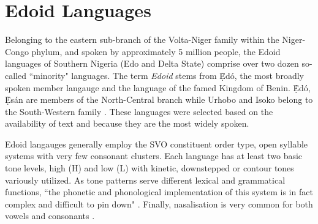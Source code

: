 \documentclass{article} %
\begin{document}

\section{Edoid Languages}


Belonging to the eastern sub-branch of the Volta-Niger family within the Niger-Congo phylum, and spoken by approximately 5 million people, the Edoid languages of Southern Nigeria (Edo and Delta State) comprise over two dozen so-called ``minority" languages. The term \emph{Edoid} stems from \d{\`E}d{\'o}, the most broadly spoken member langauge and the language of the famed Kingdom of Benin. \d{\`E}d{\'o}, \d{\`E}s{\'a}n are members of the North-Central branch while Urhobo and Isoko belong to the South-Western family \citep{wiki_Edoid}. These languages were selected based on the availability of text and because they are the most widely spoken.

Edoid langauges generally employ the SVO constituent order type, open syllable systems with very few consonant clusters. Each language has at least two basic tone levels, high (H) and low (L) with kinetic, downstepped or contour tones variously utilized. As tone patterns serve different lexical and grammatical functions, ``the phonetic and phonological implementation of this system is in fact complex and difficult to pin down" \citep{rolle2013phonetics, ogie2009multi, adeniyi2010tone, ilolo2013vowel}. Finally, nasalisation is very common for both vowels and consonants \citep{Elugbe_1989, isoko_phonetics, ikoyo2018phonetic}. 

\end{document}
